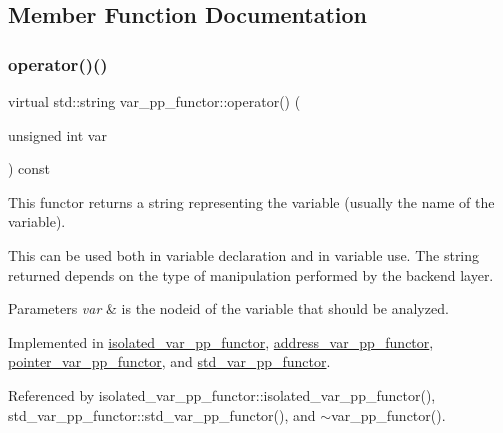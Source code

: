 \subsection{Member Function Documentation}
\mbox{\label{structvar__pp__functor_a6bcbd4e1551ac2584638ef70ecc6f361}} 
\subsubsection{\texorpdfstring{operator()()}{operator()()}}
{\footnotesize\ttfamily virtual std\+::string var\+\_\+pp\+\_\+functor\+::operator() (\begin{DoxyParamCaption}\item[{unsigned int}]{var }\end{DoxyParamCaption}) const\hspace{0.3cm}{\ttfamily [pure virtual]}}



This functor returns a string representing the variable (usually the name of the variable). 

This can be used both in variable declaration and in variable use. The string returned depends on the type of manipulation performed by the backend layer. 
\begin{DoxyParams}{Parameters}
{\em var} & is the nodeid of the variable that should be analyzed. \\
\hline
\end{DoxyParams}


Implemented in \hyperlink{structisolated__var__pp__functor_a2597699d66d8b51c9faa06d0be2e1f43}{isolated\+\_\+var\+\_\+pp\+\_\+functor}, \hyperlink{structaddress__var__pp__functor_a53bd3e80f4e77c018125c61d54001744}{address\+\_\+var\+\_\+pp\+\_\+functor}, \hyperlink{structpointer__var__pp__functor_a89023532351352a1ce6a9d40d9ec5e2c}{pointer\+\_\+var\+\_\+pp\+\_\+functor}, and \hyperlink{structstd__var__pp__functor_a0fe9aed55084be9ea80846ad5ceee014}{std\+\_\+var\+\_\+pp\+\_\+functor}.



Referenced by isolated\+\_\+var\+\_\+pp\+\_\+functor\+::isolated\+\_\+var\+\_\+pp\+\_\+functor(), std\+\_\+var\+\_\+pp\+\_\+functor\+::std\+\_\+var\+\_\+pp\+\_\+functor(), and $\sim$var\+\_\+pp\+\_\+functor().

